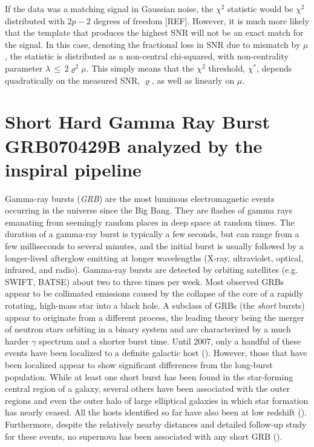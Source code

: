 \documentclass[epsf]{article}
\begin{document}
If the data was a matching signal in Gaussian noise, the ${\chi}^2$ statistic
would be ${\chi}^2$ distributed with $2p-2$ degrees of freedom
[REF].  However, it is much more likely that the template that
produces the highest SNR will not be an exact match for the signal. In this
case, denoting the fractional loss in SNR due to mismatch by ${\mu}$, the
statistic is distributed as a non-central chi-squared, with non-centrality
parameter ${\lambda}\,{\leq}\,2{\varrho}^2{\mu}$.  This simply means that
the ${\chi}^2$ threshold, ${\chi}^*$, depends quadratically on the measured
SNR, ${\varrho}$, as well as linearly on $\mu$.   

\section{Short Hard Gamma Ray Burst GRB070429B analyzed by the inspiral pipeline}

Gamma-ray bursts ({\it GRB}) are the most luminous electromagnetic events occurring in the universe since the Big Bang. They are flashes of gamma rays emanating from seemingly random places in deep space at random times. The duration of a gamma-ray burst is typically a few seconds, but can range from a few milliseconds to several minutes, and the initial burst is usually followed by a longer-lived afterglow emitting at longer wavelengths (X-ray, ultraviolet, optical, infrared, and radio). Gamma-ray bursts are detected by orbiting satellites (e.g. SWIFT, BATSE) about two to three times per week. Most observed GRBs appear to be collimated emissions caused by the collapse of the core of a rapidly rotating, high-mass star into a black hole. A subclass of GRBs (the {\it short} bursts) appear to originate from a different process, the leading theory being the merger of neutron stars orbiting in a binary system and are characterized by a much harder $\gamma$ spectrum and a shorter burst time. Until 2007, only a handful of these events have been localized to a definite galactic host (\cite{nakar}). However, those that have been localized appear to show significant differences from the long-burst population. While at least one short burst has been found in the star-forming central region of a galaxy, several others have been associated with the outer regions and even the outer halo of large elliptical galaxies in which star formation has nearly ceased. All the hosts identified so far have also been at low redshift (\cite{nakar}). Furthermore, despite the relatively nearby distances and detailed follow-up study for these events, no supernova has been associated with any short GRB (\cite{nakar}).
\end{document}
